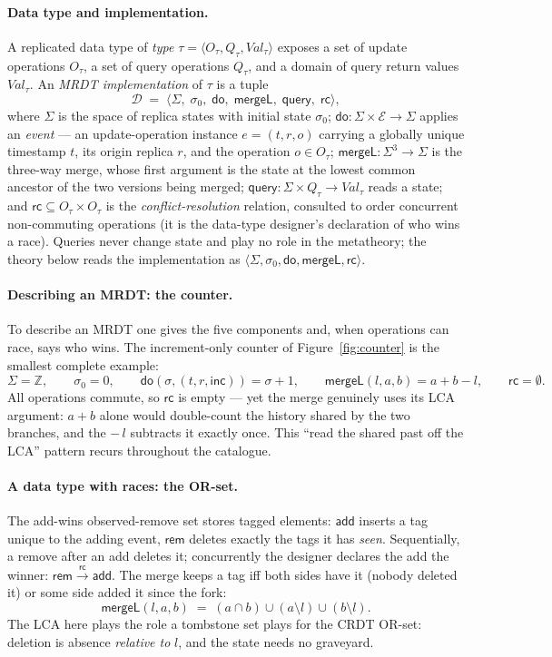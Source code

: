 \documentclass[11pt]{article}
\newcommand{\rc}{\xrightarrow{\mathsf{rc}}}
\newcommand{\add}{\mathsf{add}}
\newcommand{\rem}{\mathsf{rem}}
\newcommand{\mergeL}{\mathsf{mergeL}}
\newcommand{\Sinit}{\sigma_0}
\newcommand{\M}[1]{\mathcal{#1}}
\begin{document}
\paragraph{Data type and implementation.} A replicated data type of
\emph{type} $\tau = \langle O_\tau, Q_\tau, \mathit{Val}_\tau\rangle$
exposes a set of update operations $O_\tau$, a set of query operations
$Q_\tau$, and a domain of query return values $\mathit{Val}_\tau$. An
\emph{MRDT implementation} of $\tau$ is a tuple
\[
  \M{D} \;=\; \langle \Sigma,\; \Sinit,\; \mathsf{do},\; \mergeL,\;
  \mathsf{query},\; \mathsf{rc} \rangle ,
\]
where $\Sigma$ is the space of replica states with initial state
$\Sinit$; $\mathsf{do} : \Sigma \times \M{E} \to \Sigma$ applies an
\emph{event} --- an update-operation instance $e = (t, r, o)$ carrying a
globally unique timestamp $t$, its origin replica $r$, and the operation
$o \in O_\tau$; $\mergeL : \Sigma^3 \to \Sigma$ is the three-way merge,
whose first argument is the state at the lowest common ancestor of the
two versions being merged; $\mathsf{query} : \Sigma \times Q_\tau \to
\mathit{Val}_\tau$ reads a state; and $\mathsf{rc} \subseteq O_\tau
\times O_\tau$ is the \emph{conflict-resolution} relation, consulted to
order concurrent non-commuting operations (it is the data-type designer's
declaration of who wins a race). Queries never change state and play no
role in the metatheory; the theory below reads the implementation as
$\langle \Sigma, \Sinit, \mathsf{do}, \mergeL, \mathsf{rc}\rangle$.

\paragraph{Describing an MRDT: the counter.} To describe an MRDT one
gives the five components and, when operations can race, says who wins.
The increment-only counter of Figure~\ref{fig:counter} is the smallest
complete example:
\[
  \Sigma = \mathbb{Z}, \qquad \Sinit = 0, \qquad
  \mathsf{do}(\sigma, (t,r,\mathsf{inc})) = \sigma + 1, \qquad
  \mergeL(l,a,b) = a + b - l, \qquad \mathsf{rc} = \emptyset .
\]
All operations commute, so $\mathsf{rc}$ is empty --- yet the merge
genuinely uses its LCA argument: $a + b$ alone would double-count the
history shared by the two branches, and the $-\,l$ subtracts it exactly
once. This ``read the shared past off the LCA'' pattern recurs
throughout the catalogue.

\paragraph{A data type with races: the OR-set.} The add-wins observed-remove
set stores tagged elements: $\add$ inserts a tag unique to the adding
event, $\rem$ deletes exactly the tags it has \emph{seen}. Sequentially,
a remove after an add deletes it; concurrently the designer declares the
add the winner: $\rem \rc \add$. The merge keeps a tag iff both sides
have it (nobody deleted it) or some side added it since the fork:
\[
  \mergeL(l,a,b) \;=\; (a \cap b) \cup (a \setminus l) \cup (b \setminus l).
\]
The LCA here plays the role a tombstone set plays for the CRDT OR-set:
deletion is absence \emph{relative to} $l$, and the state needs no
graveyard.
\end{document}
